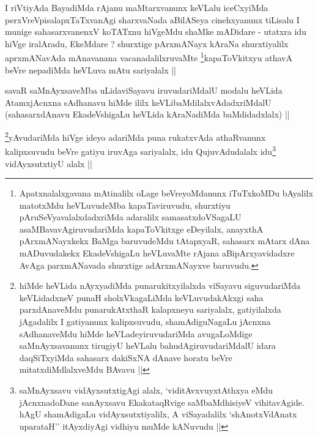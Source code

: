 
\begin{artha}
I riVtiyAda BayadiMda rAjanu maMtarxvanunx keVLalu iceCxyiMda
perxVreVpisalapxTaTxvanAgi sharxvaNada aBilASeya cinehxyanunx tiLisalu
I munige sahasarxvanenxV koTATxnu hiVgeMdu shaMke mADidare - utatxra
idu hiVge iralAradu, EkeMdare ? shurxtige pArxmANayx kAraNa
shurxtiyalilx aprxmANavAda mAnavanana
vacanadalilxruvaMte \footnote{Apatxnalalxgavana mAtinalilx oLage
  beVreyoMdanunx iTuTxkoMDu bAyalilx matotxMdu heVLuvudeMba
  kapaTaviruvudu, shurxtiyu pAruSeVyavalalxdadxriMda adaralilx
  samasatxdoVSagaLU asaMBavavAgiruvudariMda kapaToVkitxge eDeyilalx,
  anayxthA pArxmANayxkekx BaMga baruvudeMdu tAtapxyaR, sahasarx mAtarx
  dAna mADuvudakekx EkadeVshigaLu heVLuvaMte rAjana aBipArxyavidadxre
  AvAga parxmANavada shurxtige adArxmANayxve baruvudu.}kapaToVkitxyu athavA beVre nepadiMda
heVLuva mAtu sariyalalx ||
\end{artha}


\begin{artha}
savaR saMnAyxsaveMba uLidaviSayavu iruvudariMdalU modalu heVLida
AtamxjAcnxna sAdhanavu hiMde ililx keVLibaMdilalxvAdadxriMdalU
(sahasarxdAnavu EkadeVshigaLu heVLida kAraNadiMda baMdidadxlalx) ||
\end{artha}

\begin{artha}
\footnote{hiMde heVLida nAyxyadiMda punarukitxyilalxda viSayavu
  siguvudariMda keVLidadxneV punaH sholxVkagaLiMda keVLuvudakAkxgi
  saha parxdAnaveMdu punarukAtxthaR kalapxneyu sariyalalx,
  gatiyilalxda jAgadalilx I gatiyanunx kalipxsuvudu, shamAdiguNagaLu
  jAcnxna sAdhanaveMdu hiMde heVLadeyiruvudariMda avugaLoMdige
  saMnAyxsavanunx tirugiyU heVLalu bahudAgiruvudariMdalU idara
  daqSiTxyiMda sahasarx dakiSxNA dAnave horatu beVre
  mitatxdiMdlalxveMdu BAvavu ||}yAvudariMda hiVge ideyo adariMda puna rukatxvAda
athaRvanunx kalipxsuvudu beVre gatiyu iruvAga sariyalalx, idu
QujuvAdudalalx idu\footnote{saMnAyxsavu vidAyxsutxtigAgi alalx,
  `viditAvxvuyxtAthxya eMdu jAcnxnadoDane sanAyxsavu EkakataqRvige
  saMbaMdhisiyeV vihitavAgide. hAgU shamAdigaLu vidAyxsutxtiyalilx, A
  viSayadalilx `shAnotxVdAnatx uparataH'' itAyxdiyAgi vidhiyu muMde
  kANuvudu ||} vidAyxsutxtiyU alalx ||
\end{artha}


